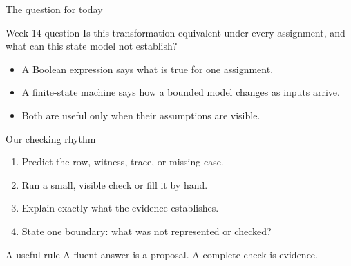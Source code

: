 \begin{frame}
\titlepage
{}
\end{frame}

\begin{frame}{The question for today}
\begin{block}{Week 14 question}
Is this transformation equivalent under every assignment, and what can this state model not establish?
\end{block}
\begin{itemize}
\item A Boolean expression says what is true for one assignment.
\item A finite-state machine says how a bounded model changes as inputs arrive.
\item Both are useful only when their assumptions are visible.
\end{itemize}
\end{frame}

\begin{frame}{Our checking rhythm}
\begin{enumerate}
\item Predict the row, witness, trace, or missing case.
\item Run a small, visible check or fill it by hand.
\item Explain exactly what the evidence establishes.
\item State one boundary: what was not represented or checked?
\end{enumerate}
\begin{block}{A useful rule}
A fluent answer is a proposal. A complete check is evidence.
\end{block}
\end{frame}

